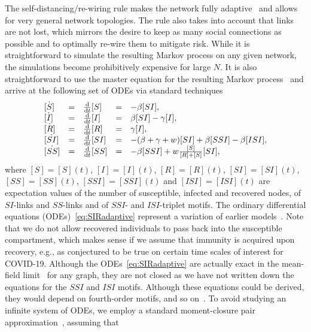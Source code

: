 \documentclass[12pt]{article}
\def\txtd{{\textnormal{d}}}
\begin{document}
The self-distancing/re-wiring rule makes the network fully adaptive~\cite{GrossSayama} and allows for very general network topologies. The rule also takes into account that links are not lost, which mirrors the desire to keep as many social connections as possible and to optimally re-wire them to mitigate risk. While it is straightforward to simulate the resulting Markov process on any given network, the simulations become prohibitively expensive for large $N$. It is also straightforward to use the master equation for the resulting Markov process~\cite{Norris} and arrive at the following set of ODEs via standard techniques~\cite{KissMillerSimon}
\begin{equation}
\label{eq:SIRadaptive}
    \begin{array}{lclcl}
 \dot{[S]}&=&\frac{\txtd }{\txtd t} [S]
 &=&
 -\beta [SI],
 \\
 \dot{[I]}&=&\frac{\txtd }{\txtd t} [I]
 &=&
 \beta [SI] - \gamma [I],
 \\
 \dot{[R]}&=&\frac{\txtd }{\txtd t} [R]
 &=&
\gamma [I],
 \\
\dot{[SI]}&=& \frac{\txtd }{\txtd t} [SI]
 &=&
 -(\beta+\gamma+w)[SI] + \beta[SSI] -\beta[ISI], 
 \\
 \dot{[SS]}&=&\frac{\txtd }{\txtd t} [SS]
 &=&
- \beta [SSI] + w\frac{[S]}{[R]+[S]} [SI],
\end{array}
\end{equation}
where $[S]=[S](t)$, $[I]=[I](t)$, $[R]=[R](t)$, $[SI]=[SI](t)$, $[SS]=[SS](t)$, $[SSI]=[SSI](t)$ and $[ISI]=[ISI](t)$ are expectation values of the number of susceptible, infected and recovered nodes, of $SI$-links and $SS$-links and of $SSI$- and $ISI$-triplet motifs. The ordinary differential equations (ODEs)~\eqref{eq:SIRadaptive} represent a variation of earlier models~\cite{ShawSchwartz,GrossDLimaBlasius}. Note that we do not allow recovered individuals to pass back into the susceptible compartment, which makes sense if we assume that immunity is acquired upon recovery, e.g., as conjectured to be true on certain time scales of interest for COVID-19. Although the ODEs~\eqref{eq:SIRadaptive} are actually exact in the mean-field limit~\cite{KissMillerSimon} for any graph, they are not closed as we have not written down the equations for the $SSI$ and $ISI$ motifs. Although these equations could be derived, they would depend on fourth-order motifs, and so on~\cite{KuehnMC,HouseKeeling}. To avoid studying an infinite system of ODEs, we employ a standard moment-closure pair approximation~\cite{KeelingRandMorris,Keeling,KissMillerSimon,GrossDLimaBlasius}, assuming that 
\end{document}
